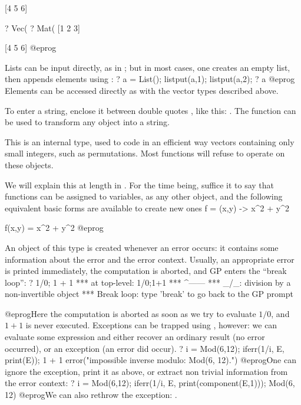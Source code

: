 [4 5 6]

? Vec(%
? Mat(%
[1 2 3]

[4 5 6]
@eprog

%
Lists can be input directly, as in ; but in most cases,
one creates an empty list, then appends elements using :
\bprog
  ? a = List(); listput(a,1); listput(a,2);
  ? a
@eprog\noindent
Elements can be accessed directly as with the vector types described above.

%
To enter a string, enclose it between double quotes , like this:
. The function  can be used to transform any
object into a string.

%
This is an internal type, used to code in an efficient way vectors containing
only small integers, such as permutations. Most  functions will
refuse to operate on these objects.

%
We will explain this at length in . For the time
being, suffice it to say that functions can be assigned to variables, as any
other object, and the following equivalent basic forms are available to
create new ones
\bprog
  f = (x,y) -> x^2 + y^2

  f(x,y) = x^2 + y^2
@eprog

%
An object of this type is created whenever an error occurs: it contains some
information about the error and the error context. Usually, an appropriate
error is printed immediately, the computation is aborted, and GP enters the
``break loop'':
\bprog
  ? 1/0; 1 + 1
    ***   at top-level: 1/0;1+1
    ***                  ^------
    *** _/_: division by a non-invertible object
    ***   Break loop: type 'break' to go back to the GP prompt

@eprog\noindent Here the computation is aborted as soon as we try to evaluate
$1/0$, and $1 + 1$ is never executed. Exceptions can be trapped
using , however: we can evaluate some expression and either recover
an ordinary result (no error occurred), or an exception (an error did occur).
\bprog
  ? i = Mod(6,12); iferr(1/i, E, print(E)); 1 + 1
  error("impossible inverse modulo: Mod(6, 12).")
@eprog\noindent One can ignore the exception, print it as above, or extract
non trivial information from the error context:
\bprog
  ? i = Mod(6,12); iferr(1/i, E, print(component(E,1)));
  Mod(6, 12)
@eprog\noindent We can also rethrow the exception: .

